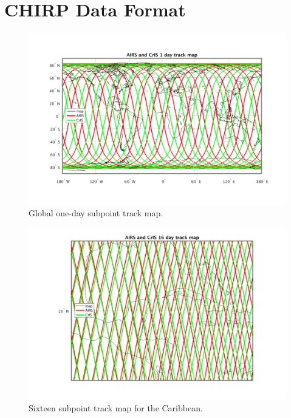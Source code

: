 \documentclass[12pt]{article}
\begin{document}
\section{CHIRP Data Format}

\begin{figure} %
\centering
\includegraphics[width=\textwidth]{figures/subpt_1_day_all.png}
\vskip-12mm
\caption{Global one-day subpoint track map.}
\label{figD}
\end{figure}

\begin{figure} %
\centering
\includegraphics[width=\textwidth]{figures/subpt_16_day_zoom.png}
\vskip-9mm
\caption{Sixteen subpoint track map for the Caribbean.}
\label{figE}
\end{figure}
\end{document}
